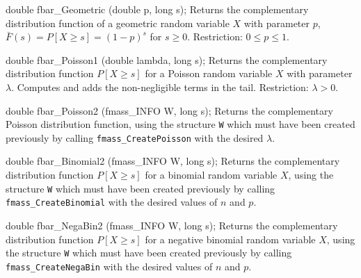 
\code

double fbar_Geometric (double p, long s);
\endcode
  \tab Returns the complementary distribution function of
   a geometric random variable $X$ with parameter $p$,
   $\bar F(s) = P[X\ge s] = (1-p)^s$
   for $s\ge 0$.
  Restriction: $0 \le p \le 1$.
 \endtab
\code


double fbar_Poisson1 (double lambda, long s);
\endcode
  \tab  Returns the complementary distribution function $P[X\ge s]$
   for a Poisson random variable $X$ with parameter $\lambda$.
   Computes and adds the non-negligible terms in the tail.
   Restriction: $\lambda > 0$.
 \endtab
\code


double fbar_Poisson2 (fmass_INFO W, long s);
\endcode
 \tab  Returns the complementary Poisson distribution function,
  using the structure {\tt W} which must have been created previously
  by calling {\tt fmass\_CreatePoisson} with the desired $\lambda$.
 \endtab
\code


double fbar_Binomial2 (fmass_INFO W, long s);
\endcode
  \tab  Returns the complementary distribution function $P[X\ge s]$
  for a binomial random variable $X$,
  using the structure {\tt W} which must have been created previously
  by calling {\tt fmass\_CreateBinomial} with the desired values of
  $n$ and $p$.
 \endtab
\code


double fbar_NegaBin2 (fmass_INFO W, long s);
\endcode
  \tab  Returns the complementary distribution function $P[X\ge s]$
  for a negative binomial random variable $X$,
  using the structure {\tt W}
  which must have been created previously
  by calling {\tt fmass\_CreateNegaBin} with the desired values of
  $n$ and $p$.
 \endtab
\code


